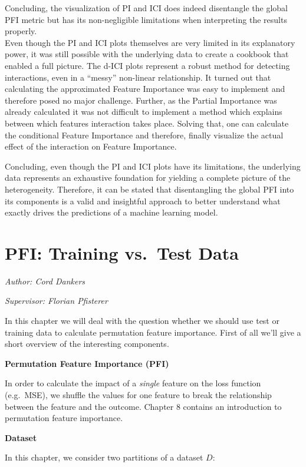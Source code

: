 \documentclass[]{krantz}
\begin{document}
Concluding, the visualization of PI and ICI does indeed disentangle the
global PFI metric but has its non-negligible limitations when
interpreting the results properly.\\
Even though the PI and ICI plots themselves are very limited in its
explanatory power, it was still possible with the underlying data to
create a cookbook that enabled a full picture. The d-ICI plots represent
a robust method for detecting interactions, even in a ``messy''
non-linear relationship. It turned out that calculating the approximated
Feature Importance was easy to implement and therefore posed no major
challenge. Further, as the Partial Importance was already calculated it
was not difficult to implement a method which explains between which
features interaction takes place. Solving that, one can calculate the
conditional Feature Importance and therefore, finally visualize the
actual effect of the interaction on Feature Importance.

Concluding, even though the PI and ICI plots have its limitations, the
underlying data represents an exhaustive foundation for yielding a
complete picture of the heterogeneity. Therefore, it can be stated that
disentangling the global PFI into its components is a valid and
insightful approach to better understand what exactly drives the
predictions of a machine learning model.

\chapter{PFI: Training vs.~Test Data}\label{pfi-data}

\emph{Author: Cord Dankers}

\emph{Supervisor: Florian Pfisterer}

In this chapter we will deal with the question whether we should use
test or training data to calculate permutation feature importance. First
of all we'll give a short overview of the interesting components.

\textbf{Permutation Feature Importance (PFI)}

In order to calculate the impact of a \emph{single} feature on the loss
function (e.g.~MSE), we shuffle the values for one feature to break the
relationship between the feature and the outcome. Chapter \(8\) contains
an introduction to permutation feature importance.

\textbf{Dataset}

In this chapter, we consider two partitions of a dataset \(D\):
\end{document}
